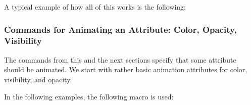 A typical example of how all of this works is the following:
\begin{codeexample}
\pgfsys@animation@repeat@indefinite %
{
  \pgfsys@animation@whom{\someid}{}%
  \pgfsys@animatefillopacity%
}
{
  \pgfsys@animation@whom{\someid}{}%
  \pgfsys@animation@val@current %
  \pgfsys@animation@val@dimension{5pt} %
  \pgfsys@animatelinewidth%
}
\end{codeexample}




\subsubsection{Commands for Animating an Attribute: Color, Opacity, Visibility}

The commands from this and the next sections specify that some
attribute should be animated. We start with rather basic animation
attributes for color, visibility, and opacity.

In the following examples, the following macro is used:
\begin{codeexample}[]
\def\animationexample#1#2#3{ 
  \tikz[fill=blue!25, draw=blue, ultra thick] {
    \pgfidrefnextuse{\objid}{#1}
    \pgfsys@animation@whom{\objid}{#2}
    \pgfidrefnextuse{\nodeid}{node}
    \pgfsys@animation@event{\nodeid}{}{click}{}{begin}
    \pgfsys@animation@time{0}{1}{1}{0}{0}
    \pgfsys@animation@val@current
    \pgfsys@animation@time{2}{1}{1}{0}{0}
    #3
    \node [font=\scriptsize, circle, fill, draw, align=center]
      (node) {Click \\ here};
  }
}  
\end{codeexample}
\def\animationexample#1#2#3{ 
  \tikz[fill=blue!25, draw=blue, ultra thick] {
    \pgfidrefnextuse{\objid}{#1}
    \pgfsys@animation@whom{\objid}{#2}
    \pgfidrefnextuse{\nodeid}{node}
    \pgfsys@animation@event{\nodeid}{}{click}{}{begin}
    \pgfsys@animation@time{0}{1}{1}{0}{0}
    \pgfsys@animation@val@current
    \pgfsys@animation@time{2}{1}{1}{0}{0}
    #3
    \node [font=\scriptsize, circle, fill, draw, align=center]
      (node) {Click \\ here};
  }
}  


